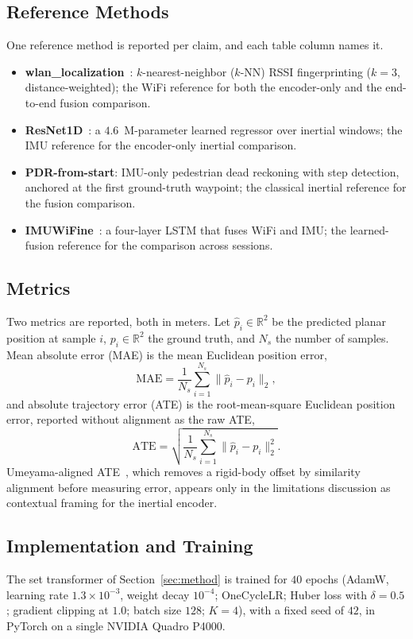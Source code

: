 \subsection{Reference Methods}

\noindent
One reference method is reported per claim, and each table column names it.

\begin{itemize}
\item \textbf{wlan\_localization}~\cite{wlanloc}: $k$-nearest-neighbor
  ($k$-NN) RSSI fingerprinting ($k=3$, distance-weighted); the WiFi reference for
  both the encoder-only and the end-to-end fusion comparison.
\item \textbf{ResNet1D}~\cite{yan2019ronin}: a $4.6$~M-parameter learned regressor
  over inertial windows; the IMU reference for the encoder-only inertial
  comparison.
\item \textbf{PDR-from-start}: IMU-only pedestrian dead reckoning with step
  detection, anchored at the first ground-truth waypoint; the classical inertial
  reference for the fusion comparison.
\item \textbf{IMUWiFine}~\cite{nurpeiissov2022imuwifine}: a four-layer LSTM
  that fuses WiFi and IMU; the learned-fusion reference for the comparison across
  sessions.
\end{itemize}

\subsection{Metrics}

\noindent
Two metrics are reported, both in meters. Let $\hat{p}_i \in \mathbb{R}^2$ be the
predicted planar position at sample $i$, $p_i \in \mathbb{R}^2$ the ground truth,
and $N_s$ the number of samples. Mean absolute error (MAE) is the mean Euclidean
position error,
%
\begin{equation}
  \mathrm{MAE} = \frac{1}{N_s} \sum_{i=1}^{N_s} \lVert \hat{p}_i - p_i \rVert_2 ,
  \label{eq:mae}
\end{equation}
%
and absolute trajectory error (ATE) is the root-mean-square Euclidean position
error, reported without alignment as the raw ATE,
%
\begin{equation}
  \mathrm{ATE} = \sqrt{ \frac{1}{N_s} \sum_{i=1}^{N_s}
    \lVert \hat{p}_i - p_i \rVert_2^2 } .
  \label{eq:ate}
\end{equation}
%
Umeyama-aligned ATE~\cite{umeyama1991}, which removes a rigid-body offset by
similarity alignment before measuring error, appears only in the limitations
discussion as contextual framing for the inertial encoder.

\subsection{Implementation and Training}

\noindent
The set transformer of Section~\ref{sec:method} is trained for $40$ epochs
(AdamW, learning rate $1.3\times10^{-3}$, weight decay $10^{-4}$; OneCycleLR;
Huber loss with $\delta=0.5$; gradient clipping at $1.0$; batch size $128$; $K=4$), with
a fixed seed of $42$, in PyTorch on a single NVIDIA Quadro P4000.
